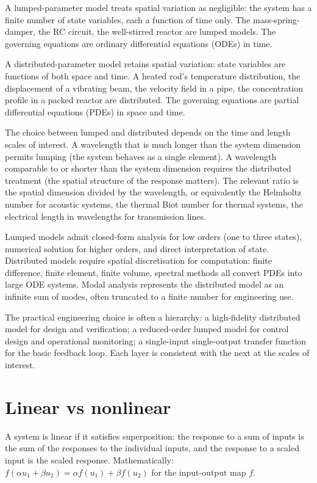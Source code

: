 A lumped-parameter model treats spatial variation as negligible: the system has a finite number of state variables, each a function of time only. The mass-spring-damper, the RC circuit, the well-stirred reactor are lumped models. The governing equations are ordinary differential equations (ODEs) in time.

A distributed-parameter model retains spatial variation: state variables are functions of both space and time. A heated rod's temperature distribution, the displacement of a vibrating beam, the velocity field in a pipe, the concentration profile in a packed reactor are distributed. The governing equations are partial differential equations (PDEs) in space and time.

The choice between lumped and distributed depends on the time and length scales of interest. A wavelength that is much longer than the system dimension permits lumping (the system behaves as a single element). A wavelength comparable to or shorter than the system dimension requires the distributed treatment (the spatial structure of the response matters). The relevant ratio is the spatial dimension divided by the wavelength, or equivalently the Helmholtz number for acoustic systems, the thermal Biot number for thermal systems, the electrical length in wavelengths for transmission lines.

Lumped models admit closed-form analysis for low orders (one to three states), numerical solution for higher orders, and direct interpretation of state. Distributed models require spatial discretisation for computation: finite difference, finite element, finite volume, spectral methods all convert PDEs into large ODE systems. Modal analysis represents the distributed model as an infinite sum of modes, often truncated to a finite number for engineering use.

The practical engineering choice is often a hierarchy: a high-fidelity distributed model for design and verification; a reduced-order lumped model for control design and operational monitoring; a single-input single-output transfer function for the basic feedback loop. Each layer is consistent with the next at the scales of interest.

\section{Linear vs nonlinear}

A system is linear if it satisfies superposition: the response to a sum of inputs is the sum of the responses to the individual inputs, and the response to a scaled input is the scaled response. Mathematically: $f(\alpha u_1 + \beta u_2) = \alpha f(u_1) + \beta f(u_2)$ for the input-output map $f$.

